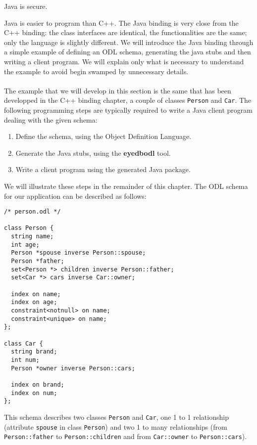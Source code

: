 \item Java is secure.
\item Java is easier to program than C++.
\ei
The Java binding is very close from the C++ binding: the
class interfaces are identical, the functionalities
are the same; only the language is slightly different.
We will introduce the Java binding through a simple example of
defining an ODL schema, generating the java stubs and then writing
a client program.
We will explain only what is necessary to understand the example
to avoid begin swamped by unnecessary details.
\\
\\
The example that we will develop in this section is the same that
has been developped in the C++ binding chapter, a couple of classes
\texttt{Person} and \texttt{Car}.
The following programming steps are typically required to write a Java
client program dealing with the given schema:
\begin{enumerate}
\item Define the schema, using the \eyedb Object Definition Language.
\item Generate the Java stubs, using the {\bf eyedbodl} tool.
\item Write a client program using the generated Java package.
\end{enumerate}
We will illustrate these steps in the remainder of this chapter.
The ODL schema for our application can be described as follows:

{\verbsize \begin{verbatim}
/* person.odl */

class Person {
  string name;
  int age;
  Person *spouse inverse Person::spouse;
  Person *father;
  set<Person *> children inverse Person::father;
  set<Car *> cars inverse Car::owner;

  index on name;
  index on age;
  constraint<notnull> on name;
  constraint<unique> on name;
};

class Car {
  string brand;
  int num;
  Person *owner inverse Person::cars;

  index on brand;
  index on num;
};
\end{verbatim}
}
This schema describes two classes \texttt{Person} and \texttt{Car}, one 1 to 1
relationship (attribute \texttt{spouse} in class \texttt{Person}) and two 1 to many
relationships (from \texttt{Person::father} to \texttt{Person::children}
and from \texttt{Car::owner} to \texttt{Person::cars}).

